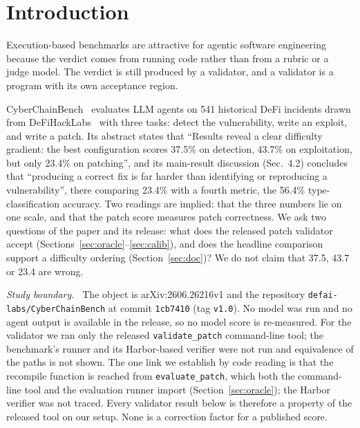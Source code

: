 \documentclass[conference]{IEEEtran}
\newcommand{\code}[1]{\texttt{#1}}
\newcommand{\ccb}{CyberChainBench}
\newcommand{\para}[1]{\textit{#1.}\ }
\begin{document}
\section{Introduction}
Execution-based benchmarks are attractive for agentic software engineering because the verdict comes from running code rather than from a rubric or a judge model. The verdict is still produced by a validator, and a validator is a program with its own acceptance region.

\ccb{}~\cite{ccb} evaluates LLM agents on 541 historical DeFi incidents drawn from DeFiHackLabs~\cite{dfhl} with three tasks: detect the vulnerability, write an exploit, and write a patch. Its abstract states that ``Results reveal a clear difficulty gradient: the best configuration scores 37.5\% on detection, 43.7\% on exploitation, but only 23.4\% on patching'', and its main-result discussion (Sec.~4.2) concludes that ``producing a correct fix is far harder than identifying or reproducing a vulnerability'', there comparing 23.4\% with a fourth metric, the 56.4\% type-classification accuracy. Two readings are implied: that the three numbers lie on one scale, and that the patch score measures patch correctness. We ask two questions of the paper and its release: what does the released patch validator accept (Sections~\ref{sec:oracle}--\ref{sec:calib}), and does the headline comparison support a difficulty ordering (Section~\ref{sec:doc})? We do not claim that 37.5, 43.7 or 23.4 are wrong.

\para{Study boundary} The object is arXiv:2606.26216v1 and the repository \code{defai-labs/CyberChainBench} at commit \code{1cb7410} (tag \code{v1.0}). No model was run and no agent output is available in the release, so no model score is re-measured. For the validator we ran only the released \code{validate\_patch} command-line tool; the benchmark's runner and its Harbor-based verifier were not run and equivalence of the paths is not shown. The one link we establish by code reading is that the recompile function is reached from \code{evaluate\_patch}, which both the command-line tool and the evaluation runner import (Section~\ref{sec:oracle}); the Harbor verifier was not traced. Every validator result below is therefore a property of the released tool on our setup. None is a correction factor for a published score.
\end{document}
